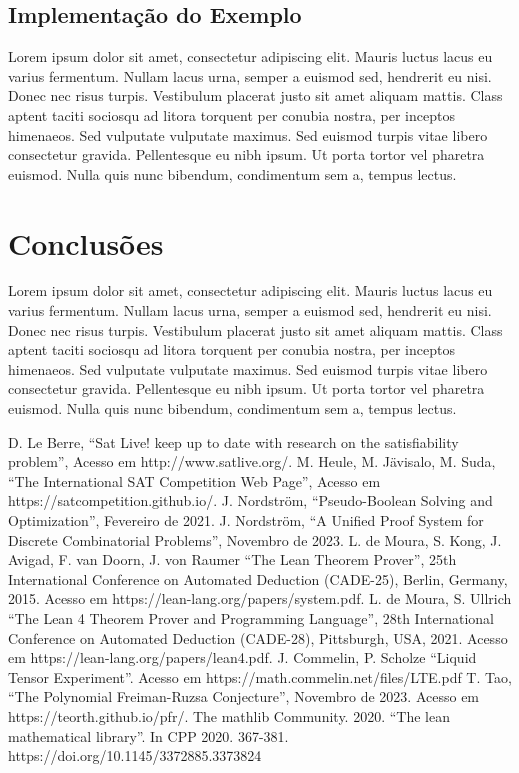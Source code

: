 \documentclass[conference]{IEEEtran}
\begin{document}
\subsection{Implementação do Exemplo}
Lorem ipsum dolor sit amet, consectetur adipiscing elit. Mauris luctus lacus eu varius fermentum. Nullam lacus urna, semper a euismod sed, hendrerit eu nisi. Donec nec risus turpis. Vestibulum placerat justo sit amet aliquam mattis. Class aptent taciti sociosqu ad litora torquent per conubia nostra, per inceptos himenaeos. Sed vulputate vulputate maximus. Sed euismod turpis vitae libero consectetur gravida. Pellentesque eu nibh ipsum. Ut porta tortor vel pharetra euismod. Nulla quis nunc bibendum, condimentum sem a, tempus lectus.

\section*{Conclusões}
Lorem ipsum dolor sit amet, consectetur adipiscing elit. Mauris luctus lacus eu varius fermentum. Nullam lacus urna, semper a euismod sed, hendrerit eu nisi. Donec nec risus turpis. Vestibulum placerat justo sit amet aliquam mattis. Class aptent taciti sociosqu ad litora torquent per conubia nostra, per inceptos himenaeos. Sed vulputate vulputate maximus. Sed euismod turpis vitae libero consectetur gravida. Pellentesque eu nibh ipsum. Ut porta tortor vel pharetra euismod. Nulla quis nunc bibendum, condimentum sem a, tempus lectus.

\begin{thebibliography}{00}
           D. Le Berre, ``Sat Live! keep up to date with research on the satisfiability problem'', Acesso em http://www.satlive.org/.
           M. Heule, M. Jävisalo, M. Suda, ``The International SAT Competition Web Page'', Acesso em https://satcompetition.github.io/.
           J. Nordström, ``Pseudo-Boolean Solving and Optimization'', Fevereiro de 2021.
          J. Nordström, ``A Unified Proof System for Discrete Combinatorial Problems'', Novembro de 2023.
        L. de Moura, S. Kong, J. Avigad, F. van Doorn, J. von Raumer ``The Lean Theorem Prover'', 25th International Conference on Automated Deduction (CADE-25), Berlin, Germany, 2015. Acesso em https://lean-lang.org/papers/system.pdf.
             L. de Moura, S. Ullrich ``The Lean 4 Theorem Prover and Programming Language'', 28th International Conference on Automated Deduction (CADE-28), Pittsburgh, USA, 2021. Acesso em https://lean-lang.org/papers/lean4.pdf.
               J. Commelin, P. Scholze ``Liquid Tensor Experiment''. Acesso em https://math.commelin.net/files/LTE.pdf
               T. Tao, ``The Polynomial Freiman-Ruzsa Conjecture'', Novembro de 2023. Acesso em https://teorth.github.io/pfr/.
          The mathlib Community. 2020. ``The lean mathematical library''. In CPP 2020. 367-381. https://doi.org/10.1145/3372885.3373824
\end{thebibliography}
\vspace{12pt}
\end{document}
